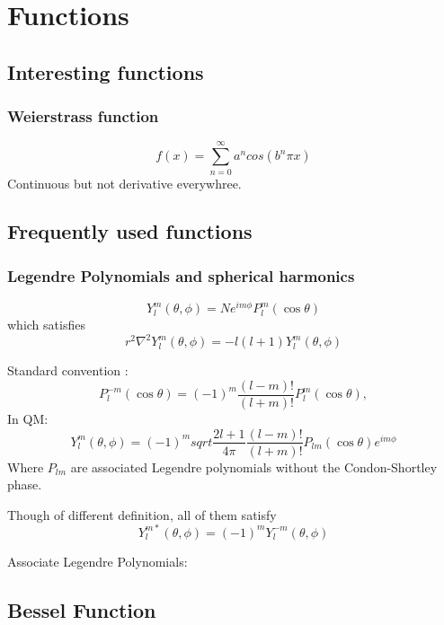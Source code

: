 \section{Functions}

\subsection{Interesting functions}
\subsubsection{Weierstrass function}
\begin{equation}
    f(x) = \sum_{n=0}^{\infty}a^{n}cos(b^{n}\pi x)
\end{equation}
Continuous but not derivative everywhree.


\subsection{Frequently used functions}

\subsubsection{Legendre Polynomials and spherical harmonics}
\begin{equation}
    Y^m_l(\theta,\phi)=Ne^{im\phi}P^m_l(\cos\theta)
\end{equation}
which satisfies
\[
    r^2\nabla^2Y^m_l(\theta,\phi)=-l(l+1)Y^m_l(\theta,\phi)
    \]

Standard convention :
\[
    P^{-m}_l(\cos\theta)=(-1)^m\frac{(l-m)!}{(l+m)!}P^m_l(\cos\theta),
\]
In QM:
\[
    Y^m_l(\theta,\phi)=(-1)^msqrt{\frac{2l+1}{4\pi}\frac{(l-m)!}{(l+m)!}}P_{lm}(\cos\theta)e^{im\phi}
\]
Where $P_{lm}$ are associated Legendre polynomials without the
Condon-Shortley phase.

Though of different definition, all of them satisfy
\[ 
    Y_l^{m*}(\theta,\phi)=(-1)^{m}Y_{l}^{-m}(\theta,\phi) 
    \]


Associate Legendre Polynomials:

\subsection{Bessel Function}
